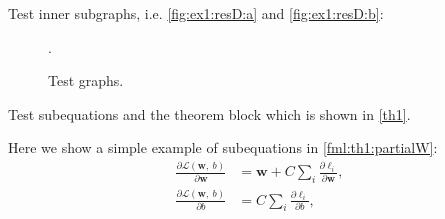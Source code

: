 \documentclass[mainfont=Palatino,color]{IEEERev} %
\begin{document}
\begin{example} \label{ex1}
  Test inner subgraphs, i.e. \autoref{fig:ex1:resD:a} and \autoref{fig:ex1:resD:b}:
  
  \begin{figure}[H] \label{fig:ex1:resD}
		\centering
		\begin{minipage}[b]{0.48\columnwidth}
			\centering
		\end{minipage}
		\begin{minipage}[b]{0.48\columnwidth}
			\centering
		\end{minipage}
		\DeclareGraphicsExtensions.
		\caption{Test graphs.}
	\end{figure}
	
	\qED
	
\end{example}

Test subequations and the theorem block which is shown in \autoref{th1}.

\begin{theorem} \label{th1}
  Here we show a simple example of subequations in \eqref{fml:th1:partialW}:
  \begin{subequations}
    \renewcommand{\theequation}
    {\theparentequation-\arabic{equation}}
    \begin{align}
      \frac{\partial \mathcal{L}(\mathbf{w},~b)}{\partial \mathbf{w}} &= \mathbf{w} + C \sum\limits_i\frac{\partial \ell_i}{\partial \mathbf{w}}, \label{fml:th1:partialW}\\
      \frac{\partial \mathcal{L}(\mathbf{w},~b)}{\partial b} &= C \sum\limits_i\frac{\partial \ell_i}{\partial b}, \label{fml:th1:partialb}
    \end{align}
  \end{subequations}
\end{theorem}
\end{document}

